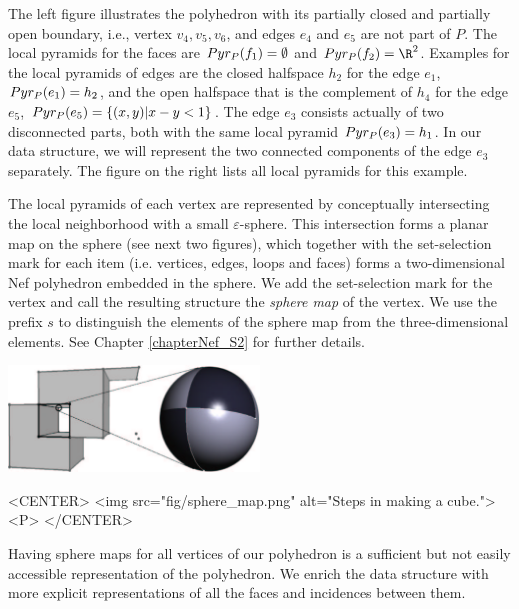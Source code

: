 The left figure illustrates the polyhedron with
its partially closed and partially open boundary, i.e., vertex 
$v_4, v_5, v_6$, and edges $e_4$ and $e_5$ are not part of $P$.
The local pyramids for the faces are $Pyr_P(f_1) = \emptyset$
and $\pyr_P(f_2) = \R^2$. Examples for the local pyramids of edges
are the closed halfspace $h_2$ for the edge $e_1$, $Pyr_P(e_1) = h_2$,
and the open halfspace that is the complement of $h_4$ for the 
edge $e_5$, $Pyr_P(e_5) =
\{(x,y) | x - y < 1\}$. The edge $e_3$ consists actually of two
disconnected parts, both with the same local pyramid $Pyr_P(e_3) = h_1$.
In our data structure, we will represent the two connected
components of the edge $e_3$ separately.
The figure on the right  
lists all local pyramids for this example.


The local pyramids of each vertex are represented by
conceptually intersecting the local neighborhood with a small
$\varepsilon$-sphere. This intersection forms a planar map on the
sphere (see next two figures), which together with the set-selection
mark for each item (i.e. vertices, edges, loops and faces)
forms a two-dimensional Nef polyhedron embedded in
the sphere. We add the set-selection mark for the vertex and call the
resulting structure the \emph{sphere map} of the vertex.  
We use the prefix $s$ to distinguish the elements of the sphere map
from the three-dimensional elements. See Chapter \ref{chapterNef_S2} 
for further details.

\begin{ccTexOnly}
    \begin{center}
      \parbox{0.5\textwidth}{%
          \includegraphics[width=0.5\textwidth]{Nef_3/fig/sphere_map}%
      }
    \end{center}
\end{ccTexOnly}

\begin{ccHtmlOnly}
    <CENTER>
        <img src="fig/sphere_map.png" alt="Steps in making a cube."><P>
    </CENTER>
\end{ccHtmlOnly}

Having sphere maps for all vertices of our polyhedron is a sufficient
but not easily accessible representation of the polyhedron. We enrich
the data structure with more explicit representations of all the faces
and incidences between them. 

